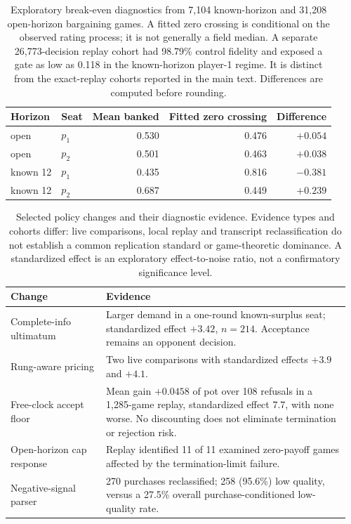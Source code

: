 \documentclass{article}
\begin{document}
\begin{table}[H]
\centering\small
\caption{Exploratory break-even diagnostics from 7,104 known-horizon and
31,208 open-horizon bargaining games. A fitted zero crossing is conditional on
the observed rating process; it is not generally a field median. A separate
26,773-decision replay cohort had 98.79\% control fidelity and exposed a gate
as low as 0.118 in the known-horizon player-1 regime. It is distinct from the
exact-replay cohorts reported in the main text. Differences are computed before
rounding.}
\label{tab:breakeven}
\begin{tabular}{@{}llrrr@{}}
\toprule
Horizon & Seat & Mean banked & Fitted zero crossing & Difference\\
\midrule
open & $p_1$ & 0.530 & 0.476 & $+0.054$\\
open & $p_2$ & 0.501 & 0.463 & $+0.038$\\
known 12 & $p_1$ & 0.435 & 0.816 & $-0.381$\\
known 12 & $p_2$ & 0.687 & 0.449 & $+0.239$\\
\bottomrule
\end{tabular}
\end{table}

\begin{table}[H]
\centering\small
\caption{Selected policy changes and their diagnostic evidence. Evidence
types and cohorts differ: live comparisons, local replay and transcript
reclassification do not establish a common replication standard or
game-theoretic dominance. A standardized effect is an exploratory
effect-to-noise ratio, not a confirmatory significance level.}
\label{tab:ledger}
\begin{tabular}{@{}p{0.27\linewidth}p{0.69\linewidth}@{}}
\toprule
Change & Evidence\\
\midrule
Complete-info ultimatum & Larger demand in a one-round known-surplus seat;
standardized effect $+3.42$, $n=214$. Acceptance remains an opponent decision.\\
Rung-aware pricing & Two live comparisons with standardized effects $+3.9$
and $+4.1$.\\
Free-clock accept floor & Mean gain $+0.0458$ of pot over 108 refusals in a
1,285-game replay, standardized effect $7.7$, with none worse. No discounting does
not eliminate termination or rejection risk.\\
Open-horizon cap response & Replay identified 11 of 11 examined zero-payoff
games affected by the termination-limit failure.\\
Negative-signal parser & 270 purchases reclassified; 258 (95.6\%) low quality,
versus a 27.5\% overall purchase-conditioned low-quality rate.\\
\bottomrule
\end{tabular}
\end{table}
\end{document}
